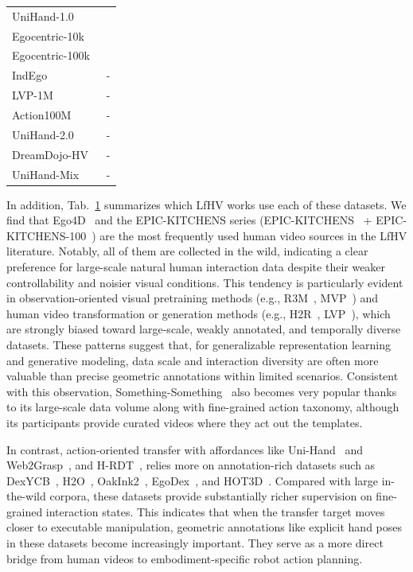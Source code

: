 \documentclass[Afour,sageh,times]{sagej}
\begin{document}
\begin{table}[t]
\begin{tabular}{p{} p{}}
UniHand-1.0~\citep{luo2025being} & \citep{luo2026joint,luo2026being} \\
Egocentric-10k~\citep{buildaiegocentric10k2025} & \citep{lin2025physbrain,luo2026being,lyu2026lda} \\
Egocentric-100k~\citep{buildaiegocentric100k2025} & \\
IndEgo~\citep{chavan2025indego} & - \\
LVP-1M~\citep{chen2025large} & - \\
Action100M~\citep{chen2026action100m} & - \\
UniHand-2.0~\citep{luo2026being} & - \\
DreamDojo-HV~\citep{gao2026dreamdojo} & - \\
UniHand-Mix~\citep{luo2026joint} & - \\
\bottomrule
\end{tabular}
\label{tab:human_video_datasets_usedby}
\end{table}
\clearpage

In addition, Tab.~\ref{tab:human_video_datasets_usedby} summarizes which LfHV works use each of these datasets. We find that Ego4D~\citep{grauman2022ego4d} and the EPIC-KITCHENS series (EPIC-KITCHENS~\citep{damen2018scaling} + EPIC-KITCHENS-100~\citep{damen2020rescaling}) are the most frequently used human video sources in the LfHV literature. Notably, all of them are collected in the wild, indicating a clear preference for large-scale natural human interaction data despite their weaker controllability and noisier visual conditions. This tendency is particularly evident in observation-oriented visual pretraining methods (e.g., R3M~\citep{nair2022r3m}, MVP~\citep{xiao2022masked}) and human video transformation or generation methods (e.g., H2R~\citep{ci2025h2r}, LVP~\citep{chen2025large}), which are strongly biased toward large-scale, weakly annotated, and temporally diverse datasets. These patterns suggest that, for generalizable representation learning and generative modeling, data scale and interaction diversity are often more valuable than precise geometric annotations within limited scenarios. Consistent with this observation, Something-Something~\citep{goyal2017something} also becomes very popular thanks to its large-scale data volume along with fine-grained action taxonomy, although its participants provide curated videos where they act out the templates.


In contrast, action-oriented transfer with affordances like Uni-Hand~\citep{ma2025uni} and Web2Grasp~\citep{chen2025web2grasp}, and H-RDT~\citep{bi2025h}, relies more on annotation-rich datasets such as DexYCB~\citep{chao2021dexycb}, H2O~\citep{kwon2021h2o}, OakInk2~\citep{zhan2024oakink2}, EgoDex~\citep{hoque2025egodex}, and HOT3D~\citep{banerjee2024hot3d}. Compared with large in-the-wild corpora, these datasets provide substantially richer supervision on fine-grained interaction states. This indicates that when the transfer target moves closer to executable manipulation, geometric annotations like explicit hand poses in these datasets become increasingly important. They serve as a more direct bridge from human videos to embodiment-specific robot action planning.
\end{document}
